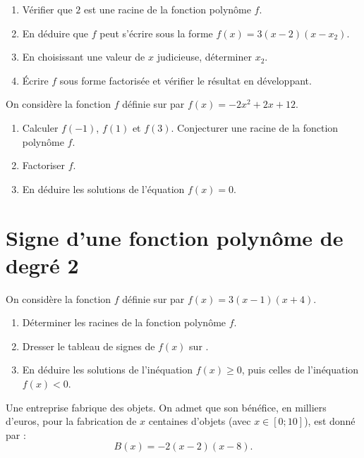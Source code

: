 \documentclass[11pt,a4paper]{book}
\begin{document}
\begin{enumerate}[label=\textbf{\arabic*)}]
	\item Vérifier que $2$ est une racine de la fonction polynôme $f$.
	\item En déduire que $f$ peut s'écrire sous la forme $f(x)=3(x-2)(x-x_2)$.
	\item En choisissant une valeur de $x$ judicieuse, déterminer $x_2$.
	\item Écrire $f$ sous forme factorisée et vérifier le résultat en développant.
\end{enumerate}

\exerciceDS{}

On considère la fonction $f$ définie sur \R par $f(x)=-2x^2+2x+12$.

\begin{enumerate}[label=\textbf{\arabic*)}]
	\item Calculer $f(-1)$, $f(1)$ et $f(3)$. Conjecturer une racine de la fonction polynôme $f$.
	\item Factoriser $f$.
	\item En déduire les solutions de l'équation $f(x)=0$.
\end{enumerate}

\section*{\color{green!55!black}Signe d'une fonction polynôme de degré 2}

\exerciceDS{}

On considère la fonction $f$ définie sur \R par $f(x)=3(x-1)(x+4)$.

\begin{enumerate}[label=\textbf{\arabic*)}]
	\item Déterminer les racines de la fonction polynôme $f$.
	\item Dresser le tableau de signes de $f(x)$ sur \R.
	\item En déduire les solutions de l'inéquation $f(x)\geq 0$, puis celles de l'inéquation $f(x)<0$.
\end{enumerate}

\exerciceDS{}

Une entreprise fabrique des objets. On admet que son bénéfice, en milliers d'euros, pour la fabrication de $x$ centaines d'objets (avec $x\in[0 ; 10]$), est donné par :
$$B(x)=-2(x-2)(x-8).$$
\end{document}

